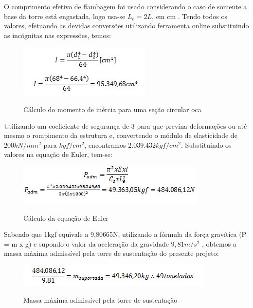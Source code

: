  O comprimento efetivo de flambagem foi usado considerando o caso de somente a base da torre está engastada, logo usa-se  $L_{e}=2L$, em cm \footnotemark. Tendo todos os valores, efetuando as devidas conversões utilizando ferramenta online \footnotemark substituindo as incógnitas nas expressões, temos: 
\begin{figure}[!h]
    \centering
    \includegraphics[scale = 1]{editaveis/figuras/calc_secao_circ}
    \label{calc_secao_circ}
    \caption[Cálculo do momento de inércia para uma seção circular oca]{Cálculo do momento de inércia para uma seção circular oca}
   \end{figure}
   \FloatBarrier
Utilizando um coeficiente de segurança de 3 para que previna deformações ou até mesmo o rompimento da estrutura e, convertendo o módulo de elasticidade de $200 kN/mm^2$ para $kgf/cm^2$, encontramos $2.039.432 kgf/cm^2$. Substituindo os valores na equação de Euler, tem-se:
\begin{figure}[!h]
    \centering
	\includegraphics[scale = 1]{editaveis/figuras/calc_euler}
    \label{calc_euler}
    \caption[Cálculo da equação de Euler]{Cálculo da equação de Euler}
   \end{figure}
   \FloatBarrier
Sabendo que 1kgf equivale a 9,80665N, utilizando a fórmula da força gravítica (P = m x g) e supondo o valor da aceleração da gravidade $9,81 m/s^2$ \footnotemark, obtemos a massa máxima admissível pela torre de sustentação do presente projeto:
\begin{figure}[!h]
    \centering
	\includegraphics[scale = 1]{editaveis/figuras/massa_max}
    \label{massa_max}
    \caption[Massa máxima admissível pela torre de sustentação]{Massa máxima admissível pela torre de sustentação}
   \end{figure}
   \FloatBarrier
   
